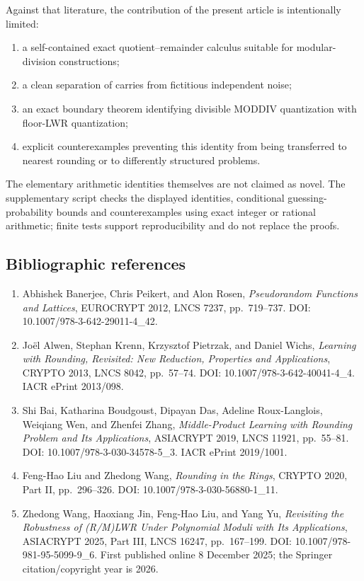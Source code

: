 \documentclass[11pt,a4paper]{article}
\providecommand{\tightlist}{\setlength{\itemsep}{0pt}\setlength{\parskip}{0pt}}
\begin{document}
Against that literature, the contribution of the present article is intentionally limited:

\begin{enumerate}
\def\labelenumi{\arabic{enumi}.}
\tightlist
\item
  a self-contained exact quotient--remainder calculus suitable for modular-division constructions;
\item
  a clean separation of carries from fictitious independent noise;
\item
  an exact boundary theorem identifying divisible MODDIV quantization with floor-LWR quantization;
\item
  explicit counterexamples preventing this identity from being transferred to nearest rounding or to differently structured problems.
\end{enumerate}

The elementary arithmetic identities themselves are not claimed as novel. The supplementary script checks the displayed identities, conditional guessing-probability bounds and counterexamples using exact integer or rational arithmetic; finite tests support reproducibility and do not replace the proofs.

\subsection{Bibliographic references}\label{bibliographic-references}

\begin{enumerate}
\def\labelenumi{\arabic{enumi}.}
\tightlist
\item
  Abhishek Banerjee, Chris Peikert, and Alon Rosen, \emph{Pseudorandom Functions and Lattices}, EUROCRYPT 2012, LNCS 7237, pp.~719--737. DOI: 10.1007/978-3-642-29011-4\_42.
\item
  Joël Alwen, Stephan Krenn, Krzysztof Pietrzak, and Daniel Wichs, \emph{Learning with Rounding, Revisited: New Reduction, Properties and Applications}, CRYPTO 2013, LNCS 8042, pp.~57--74. DOI: 10.1007/978-3-642-40041-4\_4. IACR ePrint 2013/098.
\item
  Shi Bai, Katharina Boudgoust, Dipayan Das, Adeline Roux-Langlois, Weiqiang Wen, and Zhenfei Zhang, \emph{Middle-Product Learning with Rounding Problem and Its Applications}, ASIACRYPT 2019, LNCS 11921, pp.~55--81. DOI: 10.1007/978-3-030-34578-5\_3. IACR ePrint 2019/1001.
\item
  Feng-Hao Liu and Zhedong Wang, \emph{Rounding in the Rings}, CRYPTO 2020, Part II, pp.~296--326. DOI: 10.1007/978-3-030-56880-1\_11.
\item
  Zhedong Wang, Haoxiang Jin, Feng-Hao Liu, and Yang Yu, \emph{Revisiting the Robustness of (R/M)LWR Under Polynomial Moduli with Its Applications}, ASIACRYPT 2025, Part III, LNCS 16247, pp.~167--199. DOI: 10.1007/978-981-95-5099-9\_6. First published online 8 December 2025; the Springer citation/copyright year is 2026.
\end{enumerate}
\end{document}

